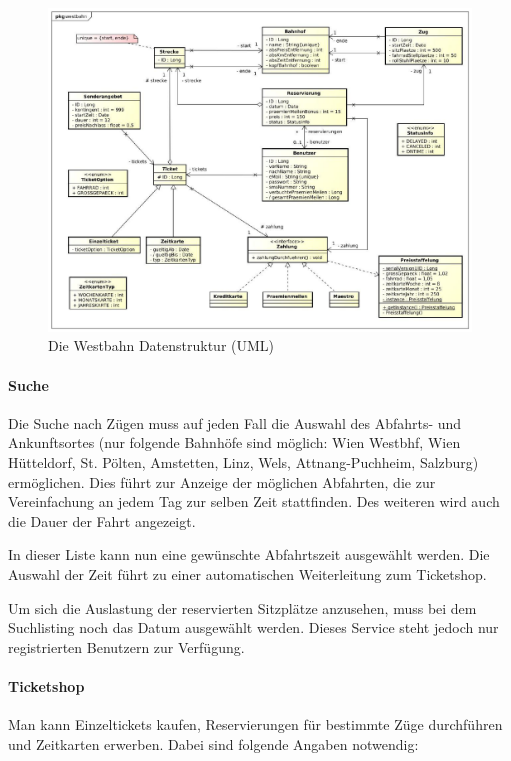 \begin{figure}[h]
    \label{fig:uml}
    \centering
        \includegraphics[width=\textwidth]{images/westbahn}
    \caption{Die Westbahn Datenstruktur (UML)}
\end{figure}

\paragraph{Suche}
Die Suche nach Z{\"u}gen muss auf jeden Fall die Auswahl des Abfahrts- und Ankunftsortes (nur folgende Bahnh{\"o}fe sind m{\"o}glich: Wien Westbhf, Wien H{\"u}tteldorf, St. P{\"o}lten, Amstetten, Linz, Wels, Attnang-Puchheim, Salzburg) erm{\"o}glichen. Dies f{\"u}hrt zur Anzeige der m{\"o}glichen Abfahrten, die zur Vereinfachung an jedem Tag zur selben Zeit stattfinden. Des weiteren wird auch die Dauer der Fahrt angezeigt.

In dieser Liste kann nun eine gew{\"u}nschte Abfahrtszeit ausgew{\"a}hlt werden. Die Auswahl der Zeit f{\"u}hrt zu einer automatischen Weiterleitung zum Ticketshop.

Um sich die Auslastung der reservierten Sitzpl{\"a}tze anzusehen, muss bei dem Suchlisting noch das Datum ausgew{\"a}hlt werden. Dieses Service steht jedoch nur registrierten Benutzern zur Verf{\"u}gung.


\paragraph{Ticketshop}
Man kann Einzeltickets kaufen, Reservierungen f{\"u}r bestimmte Z{\"u}ge durchf{\"u}hren und Zeitkarten erwerben. Dabei sind folgende Angaben notwendig:

